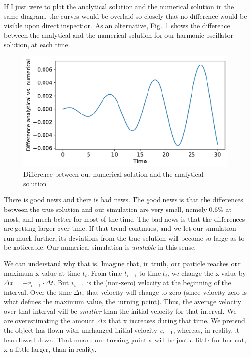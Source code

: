 \documentclass[twocolumn,apj]{openjournal}
\begin{document}
If I just were to plot the analytical solution and the numerical solution in the same diagram, the curves would be overlaid so closely that no difference would be visible upon direct inspection. As an alternative, Fig.~\ref{HOPlotDiff} shows the difference between the analytical and the numerical solution for our harmonic oscillator solution, at each time. 
\begin{figure}[htbp]
\begin{center}
\includegraphics[width=\linewidth]{oscillator-euler-diff.pdf}
\caption{Difference between our numerical solution and the analytical solution}
\label{HOPlotDiff}
\end{center}
\end{figure}
There is good news and there is bad news. The good news is that the differences between the true solution and our simulation are very small, namely 0.6\% at most, and much better for most of the time. The bad news is that the differences are getting larger over time. If that trend continues, and
we let our simulation run much further, its deviations from the true solution will become so large as to be noticeable. Our numerical simulation is {\em unstable} in this sense. 

We can understand why that is. Imagine that, in truth, our particle reaches our maximum x value at time $t_i$. From time $t_{i-1}$ to time $t_i$, we change the x value by $\Delta x=+v_{i-1}\cdot\Delta t$. But $v_{i-1}$ is the (non-zero) velocity at the beginning of the interval. Over the time $\Delta t$, that velocity will change to zero (since velocity zero is what defines the maximum value, the turning point). Thus, the average velocity over that interval will be {\em smaller} than the initial velocity for that interval. We are overestimating the amount $\Delta x$ that x increases during that time. We pretend the object has flown with unchanged initial velocity $v_{i-1}$, whereas, in reality, it has slowed down. That means our turning-point x will be just a little further out, x a little larger, than in reality. 
\end{document}
